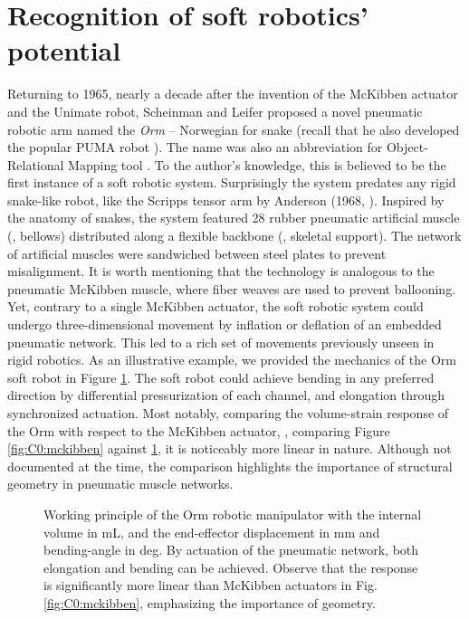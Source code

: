 \section{Recognition of soft robotics' potential} Returning to 1965, nearly a decade after the invention of the McKibben actuator and the Unimate robot, Scheinman and Leifer proposed a novel pneumatic robotic arm named the \emph{Orm} -- Norwegian for snake (recall that he also developed the popular PUMA robot \cite{BibEntryPuma2022Sep}). The name was also an abbreviation for Object-Relational Mapping tool \cite{Corke2020}. To the author's knowledge, this is believed to be the first instance of a soft robotic system. Surprisingly the system predates any rigid snake-like robot, like the Scripps tensor arm by Anderson (1968, \cite{Anderson1968}). Inspired by the anatomy of snakes, the system featured 28 rubber pneumatic artificial muscle (\ie, bellows) distributed along a flexible backbone (\ie, skeletal support). The network of artificial muscles were sandwiched between steel plates to prevent misalignment. It is worth mentioning that the technology is analogous to the pneumatic McKibben muscle, where fiber weaves are used to prevent ballooning. Yet, contrary to a single McKibben actuator, the soft robotic system could undergo three-dimensional movement by inflation or deflation of an embedded pneumatic network. This led to a rich set of movements previously unseen in rigid robotics. As an illustrative example, we provided the mechanics of the Orm soft robot in Figure \ref{fig:C0:ormrobot}. The soft robot could achieve bending in any preferred direction by differential pressurization of each channel, and elongation through synchronized actuation. Most notably, comparing the volume-strain response of the Orm with respect to the McKibben actuator, \ie, comparing Figure \ref{fig:C0:mckibben} against \ref{fig:C0:ormrobot}, it is noticeably more linear in nature. Although not documented at the time, the comparison highlights the importance of structural geometry in pneumatic muscle networks.

\begin{figure}[!t]
  \centering
  
  
  \vspace{-6mm}
  
  \caption{Working principle of the Orm robotic manipulator \cite{BibEntryOrm2019Sep} with the internal volume  in \si{\milli \liter}, and the end-effector displacement  in \si{\milli \meter} and bending-angle  in deg. By actuation of the pneumatic network, both elongation and bending can be achieved. Observe that the response is significantly more linear than McKibben actuators in Fig. \ref{fig:C0:mckibben}, emphasizing the importance of geometry.
  \vspace{-6mm}
  \label{fig:C0:ormrobot}}
\end{figure}

